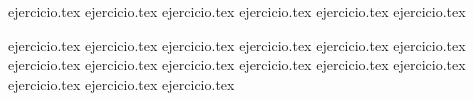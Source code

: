 \begin{enumerate}
    \setcounter{enumi}{36}
    {ejercicio.tex}
{ejercicio.tex}
{ejercicio.tex}
{ejercicio.tex}
{ejercicio.tex}
{ejercicio.tex}
\end{enumerate}

\vspace{0.3cm}
\begin{enumerate}
    \setcounter{enumi}{42}
    {ejercicio.tex}
{ejercicio.tex}
{ejercicio.tex}
{ejercicio.tex}
{ejercicio.tex}
{ejercicio.tex}
{ejercicio.tex}
{ejercicio.tex}
{ejercicio.tex}
{ejercicio.tex}
{ejercicio.tex}
{ejercicio.tex}
{ejercicio.tex}
{ejercicio.tex}
{ejercicio.tex}
\end{enumerate}
